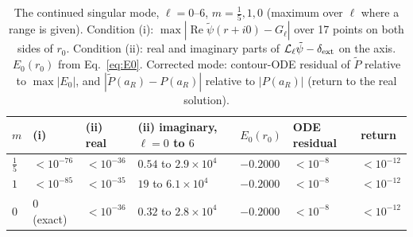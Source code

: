 \documentclass[11pt,a4paper]{article}
\renewcommand{\Re}{\operatorname{Re}}
\newcommand{\dext}{\delta_{\rm ext}}
\newcommand{\Lop}{\mathcal{L}_\ell}
\begin{document}
\begin{table}[h]
\centering
\caption{The continued singular mode, $\ell=0$--$6$, $m=\tfrac15,1,0$ (maximum over $\ell$ where a range is given). Condition (i): $\max|\Re\tilde\psi(r+i0)-G_\ell|$ over 17 points on both sides of $r_0$. Condition (ii): real and imaginary parts of $\Lop\tilde\psi-\dext$ on the axis. $E_0(r_0)$ from Eq.~\eqref{eq:E0}. Corrected mode: contour-ODE residual of $\tilde P$ relative to $\max|E_0|$, and $|\tilde P(a_R)-P(a_R)|$ relative to $|P(a_R)|$ (return to the real solution).}
\label{tab:t3}
\footnotesize
\begin{tabular}{lllllll}
\toprule
$m$ & (i) & (ii) real & (ii) imaginary, $\ell=0$ to $6$ & $E_0(r_0)$ & ODE residual & return\\
\midrule
$\tfrac15$ & $<10^{-76}$ & $<10^{-36}$ & $0.54$ to $2.9\times10^4$ & $-0.2000$ & $<10^{-8}$ & $<10^{-12}$\\
$1$ & $<10^{-85}$ & $<10^{-35}$ & $19$ to $6.1\times10^4$ & $-0.2000$ & $<10^{-8}$ & $<10^{-12}$\\
$0$ & $0$ (exact) & $<10^{-36}$ & $0.32$ to $2.8\times10^4$ & $-0.2000$ & $<10^{-8}$ & $<10^{-12}$\\
\bottomrule
\end{tabular}
\end{table}
\end{document}
